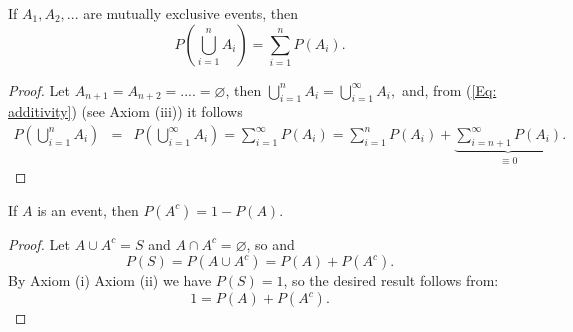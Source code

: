 \documentclass[notes=show, handout]{beamer}\usepackage[]{graphicx}\usepackage[]{color}
\newcommand{\bea}{\begin{eqnarray}}
\newcommand{\eea}{\end{eqnarray}}
\newcommand{\nn}{\nonumber}
\begin{document}
\begin{frame}{\secname}
  \begin{theorem}
  If $A_1, A_2,...$ are mutually exclusive events, then
  \begin{equation}
  P\left(  \bigcup_{i=1}^{n} A_i \right) = \sum_{i=1}^{n} P(A_i).  \label{Eq: ProbUnionDisj}
  \end{equation}
  \end{theorem} %

  \pause

  \begin{footnotesize}
  \begin{proof}
  Let $A_{n+1}=A_{n+2}=....=\varnothing$, then
  $
  \bigcup_{i=1}^{n} A_i = \bigcup_{i=1}^{\infty} A_i,
  $
  and, from (\ref{Eq: additivity}) (see Axiom (iii)) it follows
  \bea
  P\left(  \bigcup_{i=1}^{n} A_i \right) &=& P\left(  \bigcup_{i=1}^{\infty} A_i \right)
  = \sum_{i=1}^{\infty} P(A_i) = \sum_{i=1}^{n} P(A_i) + \underbrace{\sum_{i=n+1}^{\infty} P(A_i)}_{\equiv 0}. \nn
  \eea
  \end{proof}
  \end{footnotesize}
\end{frame}

\begin{frame}{\secname}
  \begin{theorem}
  \begin{center}
  If $A$ is an event, then
  $P(  A^c ) = 1- P(A).$
  \end{center}
  \end{theorem} 
  \pause
  \begin{footnotesize}
  \begin{proof}
  Let $A \cup A^c =S$ and $A \cap A^c = \varnothing$, so
  and
  $$
  P( S ) = P\left(A \cup A^c \right) =P(A) + P\left(A^c \right). \nn
  $$
  By Axiom (i) Axiom (ii) we have $P(S)=1$, so the desired result follows from:
  $$
  1 = P(A) + P\left(A^c \right).
  $$
  \end{proof}
  \end{footnotesize}
\end{frame}


%
%
%
\end{document}
